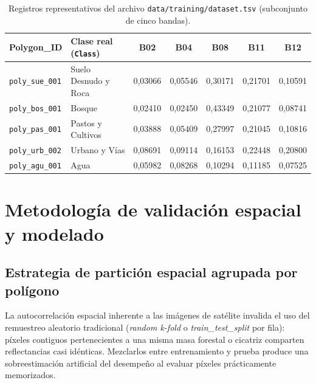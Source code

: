 \documentclass[11pt,a4paper]{article}
\begin{document}
\begin{table}[H]
\centering
\small
\begin{tabular}{l l c c c c c}
\toprule
\textbf{Polygon\_ID} & \textbf{Clase real (\texttt{Class})} & \textbf{B02} & \textbf{B04} & \textbf{B08} & \textbf{B11} & \textbf{B12} \\
\midrule
\texttt{poly\_sue\_001} & Suelo Desnudo y Roca & 0,03066 & 0,05546 & 0,30171 & 0,21701 & 0,10591 \\
\texttt{poly\_bos\_001} & Bosque               & 0,02410 & 0,02450 & 0,43349 & 0,21077 & 0,08741 \\
\texttt{poly\_pas\_001} & Pastos y Cultivos    & 0,03888 & 0,05409 & 0,27997 & 0,21045 & 0,10816 \\
\texttt{poly\_urb\_002} & Urbano y Vías        & 0,08691 & 0,09114 & 0,16153 & 0,22448 & 0,20800 \\
\texttt{poly\_agu\_001} & Agua                 & 0,05982 & 0,08268 & 0,10294 & 0,11185 & 0,07525 \\
\bottomrule
\end{tabular}
\caption{Registros representativos del archivo \texttt{data/training/dataset.tsv} (subconjunto de cinco bandas).}
\label{tab:tsv_sample}
\end{table}

\section{Metodología de validación espacial y modelado}

\subsection{Estrategia de partición espacial agrupada por polígono}
La autocorrelación espacial inherente a las imágenes de satélite invalida el uso del remuestreo aleatorio tradicional (\textit{random k-fold} o \textit{train\_test\_split} por fila): píxeles contiguos pertenecientes a una misma masa forestal o cicatriz comparten reflectancias casi idénticas. Mezclarlos entre entrenamiento y prueba produce una sobreestimación artificial del desempeño al evaluar píxeles prácticamente memorizados.
\end{document}
